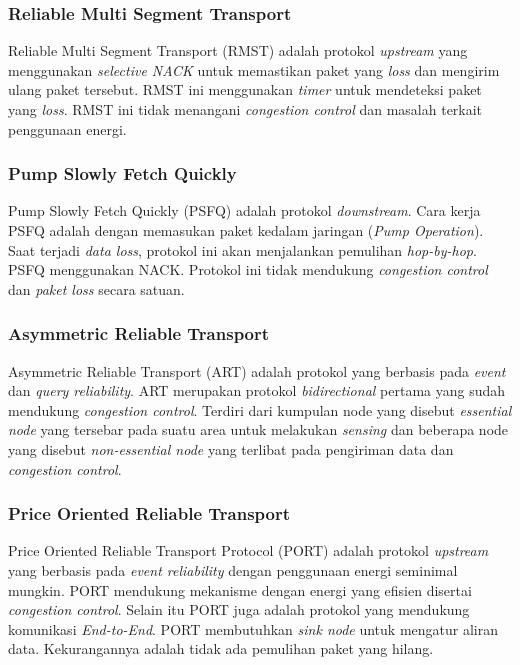 \subsubsection{Reliable Multi Segment Transport}
Reliable Multi Segment Transport (RMST) adalah protokol \textit{upstream} yang menggunakan \textit{selective NACK} untuk memastikan paket yang \textit{loss} dan mengirim ulang paket tersebut. RMST ini menggunakan \textit{timer} untuk mendeteksi paket yang \textit{loss}. RMST ini tidak menangani \textit{congestion control} dan masalah terkait penggunaan energi.

\subsubsection{Pump Slowly Fetch Quickly}
Pump Slowly Fetch Quickly (PSFQ) adalah protokol \textit{downstream}. Cara kerja PSFQ adalah dengan memasukan paket kedalam jaringan (\textit{Pump Operation}). Saat terjadi \textit{data loss}, protokol ini akan menjalankan pemulihan \textit{hop-by-hop}. PSFQ menggunakan NACK. Protokol ini tidak mendukung \textit{congestion control} dan \textit{paket loss} secara satuan.

\subsubsection{Asymmetric Reliable Transport}
Asymmetric Reliable Transport (ART) adalah protokol yang berbasis pada \textit{event} dan \textit{query reliability}. ART merupakan protokol \textit{bidirectional} pertama yang sudah mendukung \textit{congestion control}. Terdiri dari kumpulan node yang disebut \textit{essential node} yang tersebar pada suatu area untuk melakukan \textit{sensing} dan beberapa node yang disebut \textit{non-essential node} yang terlibat pada pengiriman data dan \textit{congestion control}.

\subsubsection{Price Oriented Reliable Transport}
Price Oriented Reliable Transport Protocol (PORT) adalah protokol \textit{upstream} yang berbasis pada \textit{event reliability} dengan penggunaan energi seminimal mungkin. PORT mendukung mekanisme dengan energi yang efisien disertai \textit{congestion control}. Selain itu PORT juga adalah protokol yang mendukung komunikasi \textit{End-to-End}. PORT membutuhkan \textit{sink node} untuk mengatur aliran data. Kekurangannya adalah tidak ada pemulihan paket yang hilang.

